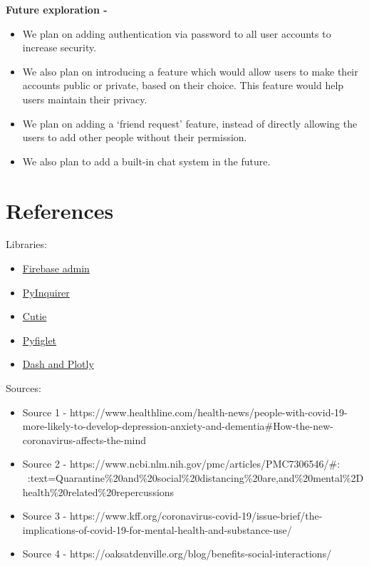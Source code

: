 \documentclass[11pt]{report}
\begin{document}
{\bf Future exploration -}

\begin{itemize}
     \item We plan on adding authentication via password to all user accounts to increase security.
     \item We also plan on introducing a feature which would allow users to make their accounts public or private, based on their choice. This feature would help users maintain their privacy.
     \item We plan on adding a `friend request' feature, instead of directly allowing the users to add other people without their permission.
     \item We also plan to add a built-in chat system in the future.
\end{itemize}




\chapter{References}

Libraries:

\begin{itemize}
    \item  \href{https://firebase.google.com/docs/reference/admin/python/firebase_admin}{\color{blue} Firebase admin} 
    \item  \href{https://github.com/eeshannarula29/Friendify}{\color{blue} PyInquirer}
    \item  \href{https://pypi.org/project/cutie/}{\color{blue} Cutie}
    \item  \href{https://www.geeksforgeeks.org/python-ascii-art-using-pyfiglet-module/}{\color{blue} Pyfiglet}
    \item  \href {https://plotly.com/python/network-graphs/}{\color{blue} Dash and Plotly}
\end{itemize}

Sources:

\begin{itemize}
    \item Source 1 - https://www.healthline.com/health-news/people-with-covid-19-more-likely-to-develop-depression-anxiety-and-dementia\#How-the-new-coronavirus-affects-the-mind
    
    \item Source 2 - https://www.ncbi.nlm.nih.gov/pmc/articles/PMC7306546/\#:\\~:text=Quarantine\%20and\%20social\%20distancing\%20are,and\%20mental\%2Dhealth\%20related\%20repercussions
    
    \item Source 3 - https://www.kff.org/coronavirus-covid-19/issue-brief/the-implications-of-covid-19-for-mental-health-and-substance-use/
    
    \item Source 4 - https://oaksatdenville.org/blog/benefits-social-interactions/
\end{itemize}

\newpage


\end{document}
